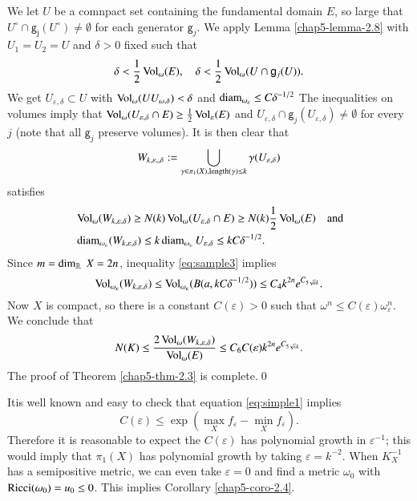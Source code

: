 We let $U$ be a  comnpact set containing the fundamental domain $E$, so large that $U^{\circ} \cap\mathsf{g_{j}}(U^{\circ}) \neq \emptyset$ for each generator $\mathsf{g}_{j}$. We apply Lemma \ref{chap5-lemma-2.8} with $U_{1} = U_{2} =U$ and $\delta > 0$ fixed such that
$$
\delta < \dfrac{1}{2}\operatorname{Vol}_{\omega}(E), \quad \delta < \dfrac{1}{2}\operatorname{Vol}_{\omega}(U\cap\mathsf{g}_{j}(U)).
$$
We get $U_{\varepsilon,\delta} \subset U$ with $\operatorname{Vol}_{\omega}(U U_{\omega, \delta}) < \delta$ and $\operatorname{diam}_{\omega_{\varepsilon}} \leq C\delta^{-1/2}$ The inequalities on volumes imply that $\operatorname{Vol}_{\omega}(U_{\varepsilon, \delta} \cap E) \geq \frac{1}{2}\operatorname{Vol}_{\varepsilon}(E)$ and $U_{\varepsilon,\delta} \cap \mathsf{g}_{j}(U_{\varepsilon, \delta}) \neq \emptyset$ for every $j$ (note that all $\mathsf{g}_{j}$ preserve volumes). It is then clear that
$$
W_{k,\varepsilon,,\delta}: = \bigcup\limits_{\gamma \in \pi_{1}(X), \operatorname{length}(\gamma)\leq k} \gamma (U_{\varepsilon, \delta})
$$
satisfies
\begin{align*}
&\operatorname{Vol}_{\omega}(W_{k,\varepsilon, \delta}) \geq N(k)\operatorname{Vol}_{\omega}(U_{\varepsilon, \delta} \cap E) \geq N(k)\frac{1}{2}\operatorname{Vol}_    {\omega}(E) \quad \text{\rm and}\\
&\operatorname{diam}_{\omega_{\varepsilon}}(W_{k,\varepsilon,\delta}) \leq k \operatorname{diam}_{\omega_{\varepsilon}}U_{\varepsilon, \delta}\leq      kC\delta^{-1/2}.
\end{align*}
Since $m=\dim_{\mathbb{R}}\; X=2n$, inequality \eqref{eq:sample3} implies
$$
\operatorname{Vol}_{\omega_{\varepsilon}}(W_{k, \varepsilon, \delta}) \leq \operatorname{Vol}_{\omega_{\varepsilon}}(B(a, kC\delta^{-1/2})) \leq C_{4}k^{2n}e^{C_{5\sqrt{\varepsilon}k}}.
$$ 
Now $X$ is compact, so there is a constant $C(\varepsilon) > 0$ such that $\omega^{n} \leq C(\varepsilon)\omega_{\varepsilon}^{n}$. We conclude that
$$
N(K)\leq \dfrac{2\operatorname{Vol}_{\omega}(W_{k,\varepsilon,\delta})}{\operatorname{Vol}_{\omega}(E)} \leq C_{6}C(\varepsilon)k^{2n}e^{C_{5 \sqrt{\varepsilon}k}}.
$$
The proof of Theorem \ref{chap5-thm-2.3} is complete.\qed

\begin{secrem}\label{chap5-remark-2.9}
It\pageoriginale is well known and easy to check that equation \eqref{eq:simple1} implies 
$$
C(\varepsilon) \leq \exp \left(\max\limits_{X} f_{\varepsilon} - \min\limits_{X}f_{\varepsilon}\right).
$$
Therefore it is reasonable to expect the $C(\varepsilon)$ has polynomial growth in $\varepsilon^{-1}$; this would imply that $\pi_{1}(X)$ has polynomial growth by taking $\varepsilon = k^{-2}$. When $K_{X}^{-1}$ has a semipositive metric, we can even take $\varepsilon = 0$ and find a metric $\omega_{0}$ with $\operatorname{Ricci}(\omega_{0}) = u_{0} \leq 0$. This implies Corollary \ref{chap5-coro-2.4}.
\end{secrem}

